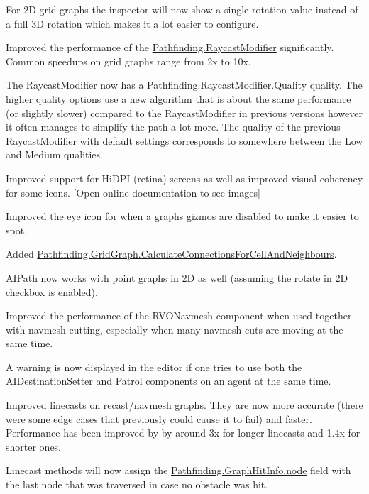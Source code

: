 \begin{DoxyItemize}
\begin{DoxyItemize}
\begin{DoxyItemize}
\item For 2D grid graphs the inspector will now show a single rotation value instead of a full 3D rotation which makes it a lot easier to configure.
\item Improved the performance of the \mbox{\hyperlink{class_pathfinding_1_1_raycast_modifier}{Pathfinding.\+Raycast\+Modifier}} significantly. Common speedups on grid graphs range from 2x to 10x.
\item The Raycast\+Modifier now has a Pathfinding.\+Raycast\+Modifier.\+Quality quality. The higher quality options use a new algorithm that is about the same performance (or slightly slower) compared to the Raycast\+Modifier in previous versions however it often manages to simplify the path a lot more. The quality of the previous Raycast\+Modifier with default settings corresponds to somewhere between the Low and Medium qualities.
\item Improved support for Hi\+D\+PI (retina) screens as well as improved visual coherency for some icons. \mbox{[}Open online documentation to see images\mbox{]}
\item Improved the \textquotesingle{}eye\textquotesingle{} icon for when a graph\textquotesingle{}s gizmos are disabled to make it easier to spot.
\item Added \mbox{\hyperlink{class_pathfinding_1_1_grid_graph_a71e6787d661d1aebd990b028e18d117a}{Pathfinding.\+Grid\+Graph.\+Calculate\+Connections\+For\+Cell\+And\+Neighbours}}.
\item A\+I\+Path now works with point graphs in 2D as well (assuming the \textquotesingle{}rotate in 2D\textquotesingle{} checkbox is enabled).
\item Improved the performance of the R\+V\+O\+Navmesh component when used together with navmesh cutting, especially when many navmesh cuts are moving at the same time.
\item A warning is now displayed in the editor if one tries to use both the A\+I\+Destination\+Setter and Patrol components on an agent at the same time.
\item Improved linecasts on recast/navmesh graphs. They are now more accurate (there were some edge cases that previously could cause it to fail) and faster. Performance has been improved by by around 3x for longer linecasts and 1.\+4x for shorter ones.
\item Linecast methods will now assign the \mbox{\hyperlink{struct_pathfinding_1_1_graph_hit_info_abc12c1ed171ac07da6cd39a06e44e02a}{Pathfinding.\+Graph\+Hit\+Info.\+node}} field with the last node that was traversed in case no obstacle was hit.

\end{DoxyItemize}
\end{DoxyItemize}
\end{DoxyItemize}
